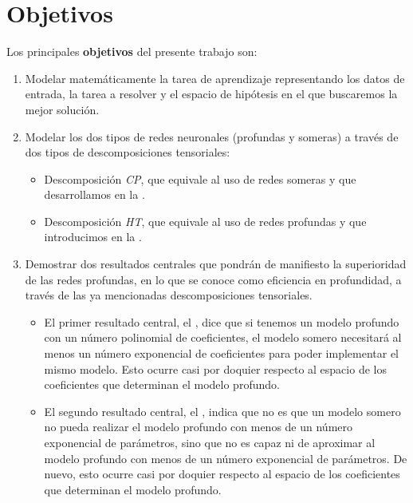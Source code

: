 \section{Objetivos}

Los principales \textbf{objetivos} del presente trabajo son:

\begin{enumerate}
	\item Modelar matemáticamente la tarea de aprendizaje representando los datos de entrada, la tarea a resolver y el espacio de hipótesis en el que buscaremos la mejor solución.
	\item Modelar los dos tipos de redes neuronales (profundas y someras) a través de dos tipos de descomposiciones tensoriales:
	      \begin{itemize}
		      \item Descomposición \textit{CP}, que equivale al uso de redes someras  y que desarrollamos en la .
		      \item Descomposición \textit{HT}, que equivale al uso de redes profundas y que introducimos en la .
	      \end{itemize}
	\item Demostrar dos resultados centrales que pondrán de manifiesto la superioridad de las redes profundas, en lo que se conoce como eficiencia en profundidad, a través de las ya mencionadas descomposiciones tensoriales.
	      \begin{itemize}
		      \item El primer resultado central, el , dice que si tenemos un modelo profundo con un número polinomial de coeficientes, el modelo somero necesitará al menos un número exponencial de coeficientes para poder implementar el mismo modelo. Esto ocurre casi por doquier respecto al espacio de los coeficientes que determinan el modelo profundo.
		      \item El segundo resultado central, el , indica que no es que un modelo somero no pueda realizar el modelo profundo con menos de un número exponencial de parámetros, sino que no es capaz ni de aproximar al modelo profundo con menos de un número exponencial de parámetros. De nuevo, esto ocurre casi por doquier respecto al espacio de los coeficientes que determinan el modelo profundo.
	      \end{itemize}
\end{enumerate}

